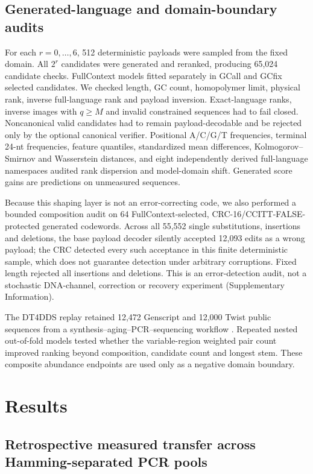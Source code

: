 \documentclass[10pt]{article}
\begin{document}
\subsection{Generated-language and domain-boundary audits}

For each $r=0,\ldots,6$, 512 deterministic payloads were sampled from the fixed domain. All $2^r$ candidates were generated and reranked, producing 65,024 candidate checks. FullContext models fitted separately in GCall and GCfix selected candidates. We checked length, GC count, homopolymer limit, physical rank, inverse full-language rank and payload inversion. Exact-language ranks, inverse images with $q\geq M$ and invalid constrained sequences had to fail closed. Noncanonical valid candidates had to remain payload-decodable and be rejected only by the optional canonical verifier. Positional A/C/G/T frequencies, terminal 24-nt frequencies, feature quantiles, standardized mean differences, Kolmogorov--Smirnov and Wasserstein distances, and eight independently derived full-language namespaces audited rank dispersion and model-domain shift. Generated score gains are predictions on unmeasured sequences.

Because this shaping layer is not an error-correcting code, we also performed a bounded composition audit on 64 FullContext-selected, CRC-16/CCITT-FALSE-protected generated codewords. Across all 55,552 single substitutions, insertions and deletions, the base payload decoder silently accepted 12,093 edits as a wrong payload; the CRC detected every such acceptance in this finite deterministic sample, which does not guarantee detection under arbitrary corruptions. Fixed length rejected all insertions and deletions. This is an error-detection audit, not a stochastic DNA-channel, correction or recovery experiment (Supplementary Information).

The DT4DDS replay retained 12,472 Genscript and 12,000 Twist public sequences from a synthesis--aging--PCR--sequencing workflow \cite{gimpel2023digitaltwin}. Repeated nested out-of-fold models tested whether the variable-region weighted pair count improved ranking beyond composition, candidate count and longest stem. These composite abundance endpoints are used only as a negative domain boundary.

\section{Results}

\subsection{Retrospective measured transfer across Hamming-separated PCR pools}
\end{document}
